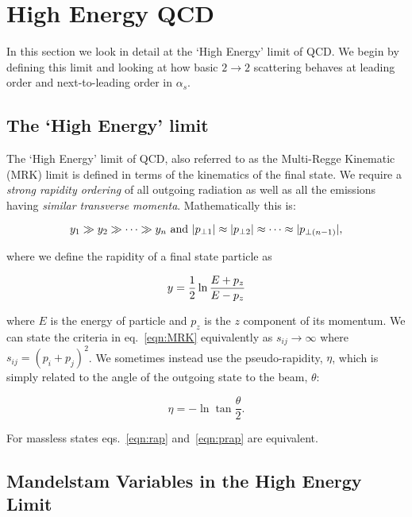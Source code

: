 \chapter{High Energy QCD}
\label{chap:HEQCD}

	In this section we look in detail at the `High Energy' limit of QCD.  We begin by defining this limit and
	looking at how basic $2\rightarrow2$ scattering behaves at leading order and next-to-leading order in
	$\alpha_s$.

	\section{The `High Energy' limit}
		\label{sub:HElimit}

		The `High Energy' limit of QCD, also referred to as the Multi-Regge Kinematic (MRK) limit is
		defined in terms of the kinematics of the final state.  We require a \emph{strong rapidity ordering}
		of all outgoing radiation as well as all the emissions having \emph{similar transverse momenta}.
		Mathematically this is:

		\begin{equation}
			y_1\gg y_2\gg\cdots\gg\\y_n \text{ and } |p_{\perp1}| \approx |p_{\perp2}| \approx\cdots\approx|p_{\perp(n-1)}|,
			\label{eqn:MRK}
		\end{equation}

  		where we define the rapidity of a final state particle as

		\begin{equation}
			y = \frac{1}{2}\ln\frac{E+p_z}{E-p_z}
			\label{eqn:rap}
		\end{equation}

		where $E$ is the energy of particle and $p_z$ is the $z$ component of its momentum. We can
		state the criteria in eq.~\eqref{eqn:MRK} equivalently as $s_{ij}\rightarrow\infty$ where
		$s_{ij} = (p_i + p_j)^2$.  We sometimes instead use the pseudo-rapidity, $\eta$, which is
		simply related to the angle of the outgoing state to the beam, $\theta$:

		\begin{equation}
			\eta = -\ln\tan\frac{\theta}{2}.
			\label{eqn:prap}
		\end{equation}

		For massless states eqs.~\eqref{eqn:rap} and~\eqref{eqn:prap} are equivalent.

	\section{Mandelstam Variables in the High Energy Limit}
		\label{sub:MandelstamVariables}

